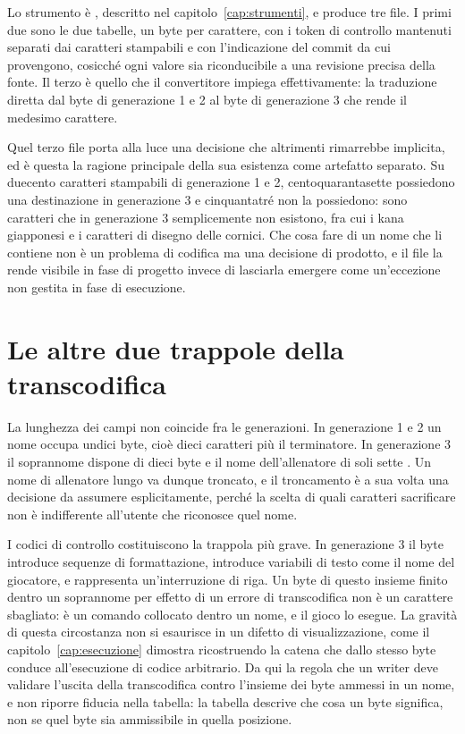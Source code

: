 Lo strumento è , descritto nel capitolo~\ref{cap:strumenti}, e produce tre file. I primi due sono le due tabelle, un byte per carattere, con i token di controllo mantenuti separati dai caratteri stampabili e con l'indicazione del commit da cui provengono, cosicché ogni valore sia riconducibile a una revisione precisa della fonte. Il terzo è quello che il convertitore impiega effettivamente: la traduzione diretta dal byte di generazione 1 e 2 al byte di generazione 3 che rende il medesimo carattere.

Quel terzo file porta alla luce una decisione che altrimenti rimarrebbe implicita, ed è questa la ragione principale della sua esistenza come artefatto separato. Su duecento caratteri stampabili di generazione 1 e 2, centoquarantasette possiedono una destinazione in generazione 3 e cinquantatré non la possiedono: sono caratteri che in generazione 3 semplicemente non esistono, fra cui i kana giapponesi e i caratteri di disegno delle cornici. Che cosa fare di un nome che li contiene non è un problema di codifica ma una decisione di prodotto, e il file la rende visibile in fase di progetto invece di lasciarla emergere come un'eccezione non gestita in fase di esecuzione.

\section{Le altre due trappole della transcodifica}

La lunghezza dei campi non coincide fra le generazioni. In generazione 1 e 2 un nome occupa undici byte, cioè dieci caratteri più il terminatore. In generazione 3 il soprannome dispone di dieci byte e il nome dell'allenatore di soli sette \cite{pokeemerald}. Un nome di allenatore lungo va dunque troncato, e il troncamento è a sua volta una decisione da assumere esplicitamente, perché la scelta di quali caratteri sacrificare non è indifferente all'utente che riconosce quel nome.

I codici di controllo costituiscono la trappola più grave. In generazione 3 il byte  introduce sequenze di formattazione,  introduce variabili di testo come il nome del giocatore, e  rappresenta un'interruzione di riga. Un byte di questo insieme finito dentro un soprannome per effetto di un errore di transcodifica non è un carattere sbagliato: è un comando collocato dentro un nome, e il gioco lo esegue. La gravità di questa circostanza non si esaurisce in un difetto di visualizzazione, come il capitolo~\ref{cap:esecuzione} dimostra ricostruendo la catena che dallo stesso byte  conduce all'esecuzione di codice arbitrario. Da qui la regola che un writer deve validare l'uscita della transcodifica contro l'insieme dei byte ammessi in un nome, e non riporre fiducia nella tabella: la tabella descrive che cosa un byte significa, non se quel byte sia ammissibile in quella posizione.
